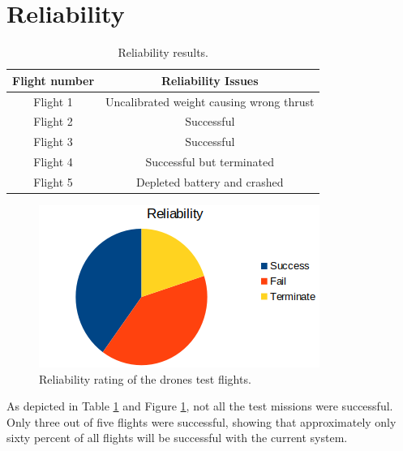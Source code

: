 \section{Reliability}\label{sect:reliability}

\begin{table}[t]
  \caption{Reliability results.}
  \begin{center}
    \begin{tabular}{|c|c|}
      \hline \textbf{Flight number} & \textbf{Reliability Issues} \\ \hline \hline
      Flight 1 & Uncalibrated weight causing wrong thrust \\ \hline
      Flight 2 & Successful\\ \hline
      Flight 3 & Successful\\ \hline 
      Flight 4 & Successful but terminated\\ \hline
      Flight 5 & Depleted battery and crashed\\ \hline
    \end{tabular}
  \end{center}
  \label{table:reliability}
\end{table} 
\FloatBarrier

\begin{figure}[t]
	\includegraphics[width=\textwidth]{figures/Ch4/religraph.png}
	\caption{Reliability rating of the drone\textquotesingle s test flights.}
	\label{fig:religraph}
\end{figure}
\FloatBarrier

As depicted in Table \ref{table:reliability} and Figure \ref{fig:religraph}, not all the test missions were successful. Only three out of five flights were successful, showing that approximately only sixty percent of all flights will be successful with the current system.


